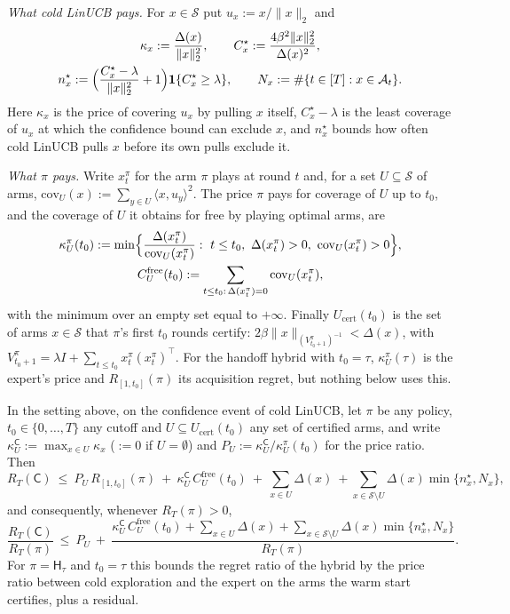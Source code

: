 \documentclass[anon]{alt2027} %
\newcommand{\ind}{\mathbf{1}}
\newcommand{\Cold}{\mathsf{C}}
\newcommand{\Hyb}{\mathsf{H}}
\begin{document}
\emph{What cold LinUCB pays.} For $x\in\mathcal S$ put $u_x:=x/\|x\|_2$ and
\begin{gather*}
\kappa_x:=\frac{\Delta(x)}{\|x\|_2^2},\qquad
C^\star_x:=\frac{4\beta^2\|x\|_2^2}{\Delta(x)^2},\\
n^\star_x:=\Bigl(\frac{C^\star_x-\lambda}{\|x\|_2^2}+1\Bigr)\ind\{C^\star_x\ge\lambda\},\qquad
N_x:=\#\{t\in[T]:x\in\mathcal A_t\}.
\end{gather*}
Here $\kappa_x$ is the price of covering $u_x$ by pulling $x$ itself,
$C^\star_x-\lambda$ is the least coverage of $u_x$ at which the confidence
bound can exclude $x$, and $n^\star_x$ bounds how often cold LinUCB pulls $x$
before its own pulls exclude it.

\emph{What $\pi$ pays.} Write $x^\pi_t$ for the arm $\pi$ plays at round $t$
and, for a set $U\subseteq\mathcal S$ of arms,
$\mathrm{cov}_U(x):=\sum_{y\in U}\langle x,u_y\rangle^2$. The price $\pi$ pays
for coverage of $U$ up to $t_0$, and the coverage of $U$ it obtains for free
by playing optimal arms, are
\begin{gather*}
\kappa^\pi_U(t_0):=\min\Bigl\{\frac{\Delta(x^\pi_t)}{\mathrm{cov}_U(x^\pi_t)}:
\ t\le t_0,\ \Delta(x^\pi_t)>0,\ \mathrm{cov}_U(x^\pi_t)>0\Bigr\},
\\
C^{\mathrm{free}}_U(t_0):=\sum_{t\le t_0:\,\Delta(x^\pi_t)=0}\mathrm{cov}_U(x^\pi_t),
\end{gather*}
with the minimum over an empty set equal to $+\infty$. Finally
$U_{\mathrm{cert}}(t_0)$ is the set of arms $x\in\mathcal S$ that $\pi$'s
first $t_0$ rounds certify: $2\beta\|x\|_{(V^\pi_{t_0+1})^{-1}}<\Delta(x)$, with
$V^\pi_{t_0+1}=\lambda I+\sum_{t\le t_0}x^\pi_t (x^\pi_t)^\top$. For the
handoff hybrid with $t_0=\tau$, $\kappa^\pi_U(\tau)$ is the expert's price and
$R_{[1,t_0]}(\pi)$ its acquisition regret, but nothing below uses this.

\begin{theorem}
\label{thm:general-price}
In the setting above, on the confidence event of cold LinUCB, let $\pi$ be
any policy, $t_0\in\{0,\dots,T\}$ any cutoff and $U\subseteq
U_{\mathrm{cert}}(t_0)$ any set of certified arms, and write
$\kappa^{\Cold}_U:=\max_{x\in U}\kappa_x$ ($:=0$ if $U=\emptyset$) and
$P_U:=\kappa^{\Cold}_U/\kappa^\pi_U(t_0)$ for the price ratio. Then
\[
R_T(\Cold)\ \le\ P_U\,R_{[1,t_0]}(\pi)\ +\ \kappa^{\Cold}_U\,C^{\mathrm{free}}_U(t_0)\ +\ \sum_{x\in U}\Delta(x)
\ +\sum_{x\in \mathcal S\setminus U}\Delta(x)\min\{n^\star_x,N_x\},
\]
and consequently, whenever $R_T(\pi)>0$,
\begin{equation}
\label{eq:general-price}
\frac{R_T(\Cold)}{R_T(\pi)}\ \le\ P_U\ +\
\frac{\kappa^{\Cold}_U\,C^{\mathrm{free}}_U(t_0)+\sum_{x\in U}\Delta(x)+\sum_{x\in \mathcal S\setminus U}\Delta(x)\min\{n^\star_x,N_x\}}{R_T(\pi)} .
\end{equation}
For $\pi=\Hyb_\tau$ and $t_0=\tau$ this bounds the regret ratio of the
hybrid by the price ratio between cold exploration and the expert on the
arms the warm start certifies, plus a residual.
\end{theorem}
\end{document}

